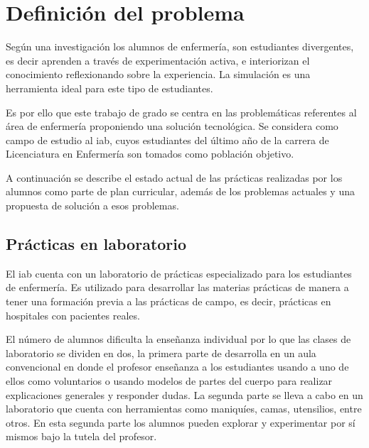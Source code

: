 \section{Definición del problema}


Según una investigación los alumnos de enfermería, son estudiantes divergentes,
es decir aprenden a través de experimentación activa, e interiorizan el
conocimiento reflexionando sobre la experiencia. La simulación es una
herramienta ideal para este tipo de estudiantes\cite{humphreys2013developing}.

Es por ello que este trabajo de grado se centra en las problemáticas referentes
al área de enfermería proponiendo una solución tecnológica. Se considera como
campo de estudio al \gls{iab}, cuyos estudiantes del último año de la carrera de
Licenciatura en Enfermería son tomados como población objetivo.

A continuación se describe el estado actual de las prácticas realizadas por los
alumnos como parte de plan curricular, además de los problemas actuales y una
propuesta de solución a esos problemas.

\subsection{Prácticas en laboratorio}

El \gls{iab} cuenta con un laboratorio de prácticas especializado para los
estudiantes de enfermería. Es utilizado para desarrollar las materias prácticas
de manera a tener una formación previa a las prácticas de campo, es decir,
prácticas en hospitales con pacientes reales.

El número de alumnos dificulta la enseñanza individual por lo que las clases de
laboratorio se dividen en dos, la primera parte de desarrolla en un aula
convencional en donde el profesor enseñanza a los estudiantes usando a uno de
ellos como voluntarios o usando modelos de partes del cuerpo para realizar
explicaciones generales y responder dudas. La segunda parte se lleva a cabo en
un laboratorio que cuenta con herramientas como maniquíes, camas, utensilios,
entre otros. En esta segunda parte los alumnos pueden explorar y experimentar
por sí mismos bajo la tutela del profesor.

